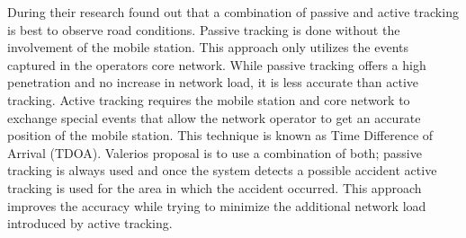 During their research found out that a combination of passive and active tracking is best to observe road conditions. Passive tracking is done without the involvement of the mobile station. This approach only utilizes the events captured in the operators core network. While passive tracking offers a high penetration and no increase in network load, it is less accurate than active tracking. Active tracking requires the mobile station and core network to exchange special events that allow the network operator to get an accurate position of the mobile station. This technique is known as Time Difference of Arrival (TDOA). Valerios proposal is to use a combination of both; passive tracking is always used and once the system detects a possible accident active tracking is used for the area in which the accident occurred. This approach improves the accuracy while trying to minimize the additional network load introduced by active tracking.
